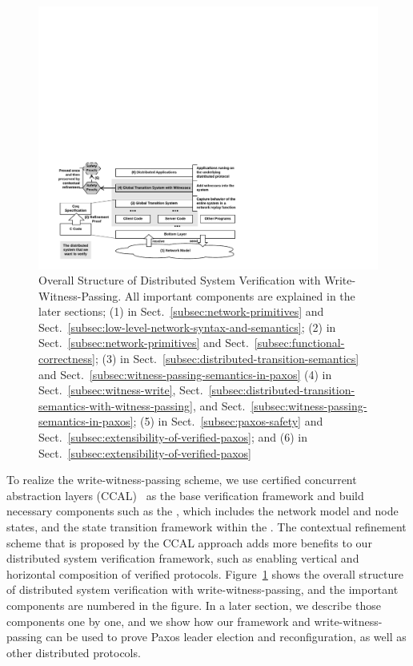 \begin{figure}
\includegraphics[scale=.70]{figs/overall_structure}
\caption{Overall Structure of Distributed System Verification with Write-Witness-Passing. 
All important components are explained in the later sections; (1) in Sect.~\ref{subsec:network-primitives} and 
Sect.~\ref{subsec:low-level-network-syntax-and-semantics}; (2) in Sect.~\ref{subsec:network-primitives} and Sect.~\ref{subsec:functional-correctness};
(3) in Sect.~\ref{subsec:distributed-transition-semantics} and Sect.~\ref{subsec:witness-passing-semantics-in-paxos}
(4) in Sect.~\ref{subsec:witness-write}, Sect.~\ref{subsec:distributed-transition-semantics-with-witness-passing}, and Sect.~\ref{subsec:witness-passing-semantics-in-paxos};
(5) in Sect.~\ref{subsec:paxos-safety} and Sect.~\ref{subsec:extensibility-of-verified-paxos}; and 
(6) in Sect.~\ref{subsec:extensibility-of-verified-paxos}}
\label{fig:overall-structure}
\end{figure}

To realize the write-witness-passing scheme, we use certified concurrent abstraction layers (CCAL)~\cite{concurrency} as the base verification framework
and build necessary components such as the \globalstate{}, which includes the network model and node states, and the state transition framework within the \globalstate{}.
The contextual refinement scheme that is proposed by the CCAL approach adds more benefits to our distributed system verification framework,
such as enabling vertical and horizontal composition of verified protocols.
Figure~\ref{fig:overall-structure} shows the overall structure of 
distributed system verification with write-witness-passing, and the important components are numbered in the figure.
In a later section, we describe those components one by one, and
we show how our framework and write-witness-passing can be used to prove Paxos leader election and reconfiguration, as well as other distributed protocols.



